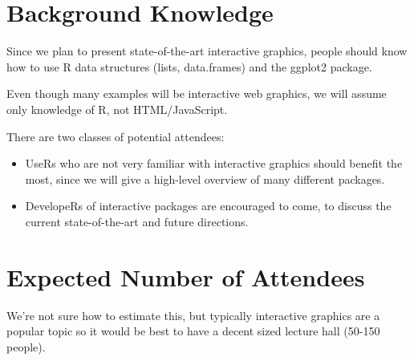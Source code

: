 \documentclass[11pt]{article}
\begin{document}

\section{Background Knowledge}
\label{sec:orgheadline12}

Since we plan to present state-of-the-art interactive graphics, people
should know how to use R data structures (lists, data.frames) and the
ggplot2 package. 

Even though many examples will be interactive web graphics, we will
assume only knowledge of R, not HTML/JavaScript.

There are two classes of potential attendees:
\begin{itemize}
\item UseRs who are not very familiar with interactive graphics should
benefit the most, since we will give a high-level overview of many
different packages.
\item DevelopeRs of interactive packages are encouraged to come, to
discuss the current state-of-the-art and future directions.
\end{itemize}

\section{Expected Number of Attendees}
\label{sec:orgheadline13}

We're not sure how to estimate this, but typically interactive
graphics are a popular topic so it would be best to have a decent
sized lecture hall (50-150 people).
\end{document}

